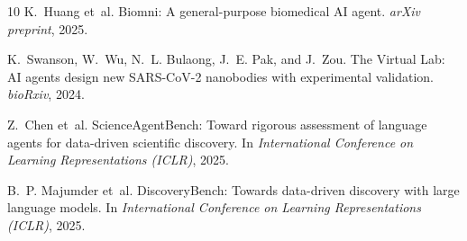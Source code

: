 \documentclass[10pt,twocolumn]{article}
\begin{document}
\begin{thebibliography}{10}
K.~Huang et~al.
\newblock Biomni: A general-purpose biomedical AI agent.
\newblock \emph{arXiv preprint}, 2025.

K.~Swanson, W.~Wu, N.~L. Bulaong, J.~E. Pak, and J.~Zou.
\newblock The Virtual Lab: AI agents design new SARS-CoV-2 nanobodies with experimental validation.
\newblock \emph{bioRxiv}, 2024.

Z.~Chen et~al.
\newblock ScienceAgentBench: Toward rigorous assessment of language agents for data-driven scientific discovery.
\newblock In \emph{International Conference on Learning Representations (ICLR)}, 2025.

B.~P. Majumder et~al.
\newblock DiscoveryBench: Towards data-driven discovery with large language models.
\newblock In \emph{International Conference on Learning Representations (ICLR)}, 2025.

\end{thebibliography}
\end{document}
